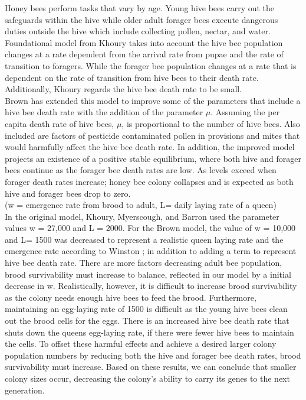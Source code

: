 \documentclass[a4paper,10pt]{article}
\begin{document}
Honey bees perform tasks that vary by age. Young hive bees carry out the safeguards within 
the hive while older adult forager bees execute dangerous duties outside the hive which include collecting pollen, nectar, and water. Foundational model from Khoury takes into account the hive bee population changes at a rate dependent from the arrival rate from pupae and the rate of transition to foragers. While the forager bee population changes at a rate that is dependent on the rate of transition from hive bees to their death rate. Additionally, Khoury regards the hive bee death rate to be small.\\

Brown has extended this model to improve some of the parameters that include a hive bee death rate with the addition of the parameter $\mu$. \cite{Seely}Assuming the per capita death rate of hive bees, $\mu$, is proportional to the number of hive bees. Also included are factors of pesticide contaminated  pollen in provisions and mites that would harmfully affect the hive bee death rate. In addition, the  improved model projects an existence of a positive stable equilibrium, where both hive and forager bees continue as the forager bee death rates are low. As levels exceed when forager death rates increase; honey bee colony collapses and is expected as both hive and forager bees drop to zero.\\

(w = emergence rate from brood to adult, L= daily laying rate of a queen)\\


In the original model, Khoury, Myerscough, and Barron \cite{Kho} used the parameter values w = 27,000 and L = 2000. For the Brown model, the value of w = 10,000 and L= 1500 was decreased to represent a realistic queen laying rate and the emergence rate according to Winston \cite{Winston}; in addition to adding a term to represent hive bee death rate. There are more factors  decreasing adult bee population, brood survivability must increase to balance, reflected in our model by a 
initial decrease in w. Realistically, however, it is difficult to increase brood survivability as the colony needs enough hive bees to feed the brood. Furthermore, maintaining an egg-laying rate of 1500 is difficult as the young hive bees clean out the brood cells for the eggs. There is an increased hive bee death rate that shuts down the queens egg-laying rate, if there were fewer hive bees to maintain the cells. 
To offset these harmful effects and achieve a desired larger colony population numbers by  reducing both the hive and forager bee death rates, brood survivability must increase. Based on  these results, we can conclude that smaller colony sizes occur, decreasing the colony's ability to carry its genes to the next generation.\\
\end{document}
